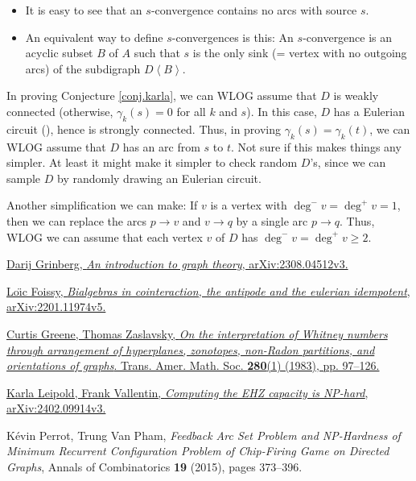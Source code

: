 \documentclass[numbers=enddot,12pt,final,onecolumn,notitlepage]{scrartcl}%
\theoremstyle{definition}
\newenvironment{noncompile}{}{}
\theoremstyle{plainsl}
\begin{document}
\begin{itemize}
\item It is easy to see that an $s$-convergence contains no arcs with source
$s$.

\item An equivalent way to define $s$-convergences is this: An $s$-convergence
is an acyclic subset $B$ of $A$ such that $s$ is the only sink (= vertex with
no outgoing arcs) of the subdigraph $D\left\langle B\right\rangle $.
\end{itemize}

\begin{noncompile}
In proving Conjecture \ref{conj.karla}, we can WLOG assume that $D$ is weakly
connected (otherwise, $\gamma_{k}\left(  s\right)  =0$ for all $k$ and $s$).
In this case, $D$ has a Eulerian circuit (\cite[Theorem 4.7.2]{22s}), hence is
strongly connected. Thus, in proving $\gamma_{k}\left(  s\right)  =\gamma
_{k}\left(  t\right)  $, we can WLOG assume that $D$ has an arc from $s$ to
$t$. Not sure if this makes things any simpler. At least it might make it
simpler to check random $D$'s, since we can sample $D$ by randomly drawing an
Eulerian circuit.

Another simplification we can make: If $v$ is a vertex with $\deg^{-}%
v=\deg^{+}v=1$, then we can replace the arcs $p\rightarrow v$ and
$v\rightarrow q$ by a single arc $p\rightarrow q$. Thus, WLOG we can assume
that each vertex $v$ of $D$ has $\deg^{-}v=\deg^{+}v\geq2$.
\end{noncompile}

\begin{thebibliography}{99999999}                                                                                         %


\href{https://arxiv.org/abs/2308.04512v3}{Darij Grinberg,
\textit{An introduction to graph theory}, arXiv:2308.04512v3.}

%
\href{https://arxiv.org/abs/2201.11974v5}{Lo\"{\i}c Foissy, \textit{Bialgebras
in cointeraction, the antipode and the eulerian idempotent},
arXiv:2201.11974v5.}

%
\href{https://doi.org/10.1090/S0002-9947-1983-0712251-1}{Curtis Greene,
Thomas Zaslavsky, \textit{On the interpretation of Whitney numbers through
arrangement of hyperplanes, zonotopes, non-Radon partitions, and orientations
of graphs}. Trans. Amer. Math. Soc. \textbf{280}(1) (1983), pp. 97--126.}

\href{https://arxiv.org/abs/2402.09914v3}{Karla
Leipold, Frank Vallentin, \textit{Computing the EHZ capacity is NP-hard},
arXiv:2402.09914v3.}

K\'{e}vin Perrot, Trung Van Pham, \textit{Feedback
Arc Set Problem and NP-Hardness of Minimum Recurrent Configuration Problem of
Chip-Firing Game on Directed Graphs}, Annals of Combinatorics \textbf{19}
(2015), pages 373--396.
\end{thebibliography}
\end{document}
